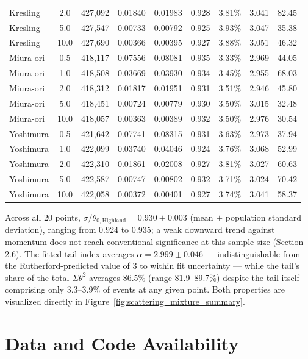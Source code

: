 \documentclass[a4paper,11pt]{article}
\begin{document}
\begin{table}[!htbp]
{\begin{tabular}{lcccccccc}
Kresling & 2.0 & 427,092 & 0.01840 & 0.01983 & 0.928 & 3.81\% & 3.041 & 82.45 \\
Kresling & 5.0 & 427,547 & 0.00733 & 0.00792 & 0.925 & 3.93\% & 3.047 & 35.38 \\
Kresling & 10.0 & 427,690 & 0.00366 & 0.00395 & 0.927 & 3.88\% & 3.051 & 46.32 \\
\midrule
Miura-ori & 0.5 & 418,117 & 0.07556 & 0.08081 & 0.935 & 3.33\% & 2.969 & 44.05 \\
Miura-ori & 1.0 & 418,508 & 0.03669 & 0.03930 & 0.934 & 3.45\% & 2.955 & 68.03 \\
Miura-ori & 2.0 & 418,312 & 0.01817 & 0.01951 & 0.931 & 3.51\% & 2.946 & 45.80 \\
Miura-ori & 5.0 & 418,451 & 0.00724 & 0.00779 & 0.930 & 3.50\% & 3.015 & 32.48 \\
Miura-ori & 10.0 & 418,057 & 0.00363 & 0.00389 & 0.932 & 3.50\% & 2.976 & 30.54 \\
\midrule
Yoshimura & 0.5 & 421,642 & 0.07741 & 0.08315 & 0.931 & 3.63\% & 2.973 & 37.94 \\
Yoshimura & 1.0 & 422,099 & 0.03740 & 0.04046 & 0.924 & 3.76\% & 3.068 & 52.99 \\
Yoshimura & 2.0 & 422,310 & 0.01861 & 0.02008 & 0.927 & 3.81\% & 3.027 & 60.63 \\
Yoshimura & 5.0 & 422,587 & 0.00747 & 0.00802 & 0.932 & 3.71\% & 3.024 & 70.42 \\
Yoshimura & 10.0 & 422,058 & 0.00372 & 0.00401 & 0.927 & 3.74\% & 3.041 & 58.37 \\
\bottomrule
\end{tabular}%
}
\end{table}
 
Across all 20 points, $\sigma/\theta_{0,\text{Highland}} = 0.930 \pm 0.003$ (mean $\pm$ population standard deviation), ranging from 0.924 to 0.935; a weak downward trend against momentum does not reach conventional significance at this sample size (Section 2.6). The fitted tail index averages $\alpha = 2.999 \pm 0.046$ --- indistinguishable from the Rutherford-predicted value of 3 to within fit uncertainty --- while the tail's share of the total $\Sigma\theta^2$ averages 86.5\% (range 81.9--89.7\%) despite the tail itself comprising only 3.3--3.9\% of events at any given point. Both properties are visualized directly in Figure~\ref{fig:scattering_mixture_summary}.

\FloatBarrier
\section{Data and Code Availability}
\label{sec:appendix_provenance}
\end{document}
